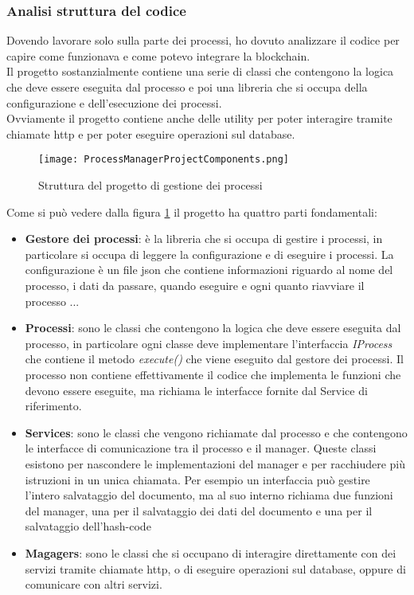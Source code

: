 \subsubsection{Analisi struttura del codice}
Dovendo lavorare solo sulla parte dei processi, ho dovuto analizzare il codice
per capire come funzionava e come potevo integrare la blockchain. \\
Il progetto sostanzialmente contiene una serie di classi che contengono la
logica che deve essere eseguita dal processo e poi una libreria che si occupa
della configurazione e dell'esecuzione dei processi. \\
Ovviamente il progetto contiene anche delle utility per poter interagire
tramite chiamate http e per poter eseguire operazioni sul database.
\begin{figure}[H]
    \centering
    \texttt{[image: ProcessManagerProjectComponents.png]}
    \caption{Struttura del progetto di gestione dei processi}
    \label{fig:process-manager-project-components}
\end{figure}

Come si può vedere dalla figura \ref{fig:process-manager-project-components} il
progetto ha quattro parti fondamentali:
\begin{itemize}
    \item \textbf{Gestore dei processi}: è la libreria che si occupa di gestire
        i processi, in particolare si occupa di leggere la configurazione e di
        eseguire i processi. La configurazione è un file json che contiene
        informazioni riguardo al nome del processo, i dati da passare, quando
        eseguire e ogni quanto riavviare il processo ...
    \item \textbf{Processi}: sono le classi che contengono la logica che deve
        essere eseguita dal processo, in particolare ogni classe deve
        implementare l'interfaccia \textit{IProcess} che contiene il metodo
        \textit{execute()} che viene eseguito dal gestore dei processi. Il
        processo non contiene effettivamente il codice che implementa le
        funzioni che devono essere eseguite, ma richiama le interfacce fornite
        dal Service di riferimento. 
    \item \textbf{Services}: sono le classi che vengono richiamate dal processo
        e che contengono le interfacce di comunicazione tra il processo e il
        manager. Queste classi esistono per nascondere le implementazioni del
        manager e per racchiudere più istruzioni in un unica chiamata. Per
        esempio un interfaccia può gestire l'intero salvataggio del documento,
        ma al suo interno richiama due funzioni del manager, una per il
        salvataggio dei dati del documento e una per il salvataggio
        dell'hash-code
    \item \textbf{Magagers}: sono le classi che si occupano di interagire
        direttamente con dei servizi tramite chiamate http, o di eseguire
        operazioni sul database, oppure di comunicare con altri servizi.
\end{itemize}

